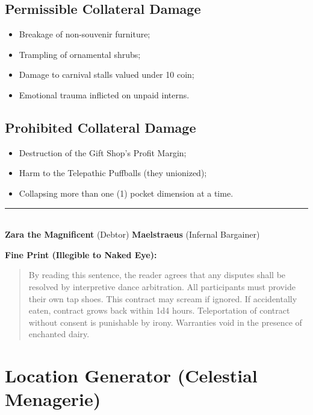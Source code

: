 \begin{tcolorbox}[title={\centering \textbf{Celestial Menagerie -- Infernal Mortgage Contract}},colback=white,colframe=black!60]
\subsection*{Permissible Collateral Damage}
\begin{itemize}
  \item Breakage of non-souvenir furniture;
  \item Trampling of ornamental shrubs;
  \item Damage to carnival stalls valued under 10 coin;
  \item Emotional trauma inflicted on unpaid interns.
\end{itemize}

\subsection*{Prohibited Collateral Damage}
\begin{itemize}
  \item Destruction of the Gift Shop's Profit Margin;
  \item Harm to the Telepathic Puffballs (they unionized);
  \item Collapsing more than one (1) pocket dimension at a time.
\end{itemize}

\vspace{0.2cm}

\begin{center}
\rule{0.8\linewidth}{0.4pt}\\
\textbf{Zara the Magnificent} (Debtor) \hfill \textbf{Maelstraeus} (Infernal Bargainer)
\end{center}

\vspace{0.2cm}

\noindent
\textbf{Fine Print (Illegible to Naked Eye):}

\scriptsize
\begin{quote}
By reading this sentence, the reader agrees that any disputes shall be resolved by interpretive dance arbitration. All participants must provide their own tap shoes. This contract may scream if ignored. If accidentally eaten, contract grows back within 1d4 hours. Teleportation of contract without consent is punishable by irony. Warranties void in the presence of enchanted dairy.
\end{quote}

\end{tcolorbox}

\section{Location Generator (Celestial Menagerie)}
\label{sec:location-generator}

